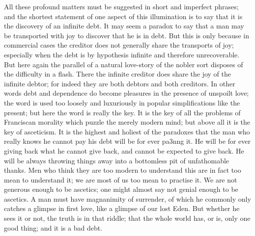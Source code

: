 \documentclass{book}
\begin{document}
All these profound matters must be suggested in short and imperfect phrases; and the shortest statement of one aspect of this illumination is to say that it is the discovery of an infinite debt. It may seem a paradox to say that a man may be transported with joy to discover that he is in debt. But this is only because in commercial cases the creditor does not generally share the transports of joy; especially when the debt is by hypothesis infinite and therefore unrecoverable. But here again the parallel of a natural love-story of the nobler sort disposes of the difficulty in a flash. There the infinite creditor does share the joy of the infinite debtor; for indeed they are both debtors and both creditors. In other words debt and dependence do become pleasures in the presence of unspoilt love; the word is used too loosely and luxuriously in popular simplifications like the present; but here the word is really the key. It is the key of all the problems of Franciscan morality which puzzle the merely modern mind; but above all it is the key of asceticism. It is the highest and holiest of the paradoxes that the man who really knows he cannot pay his debt will be for ever pa3nng it. He will be for ever giving back what he cannot give back, and cannot be expected to give back. He will be always throwing things away into a bottomless pit of unfathomable thanks. Men who think they are too modern to understand this are in fact too mean to understand it; we are most of us too mean to practise it. We are not generous enough to be ascetics; one might almost say not genial enough to be ascetics. A man must have magnanimity of surrender, of which he commonly only catches a glimpse in first love, like a glimpse of our lost Eden. But whether he sees it or not, the truth is in that riddle; that the whole world has, or is, only one good thing; and it is a bad debt.
\end{document}
